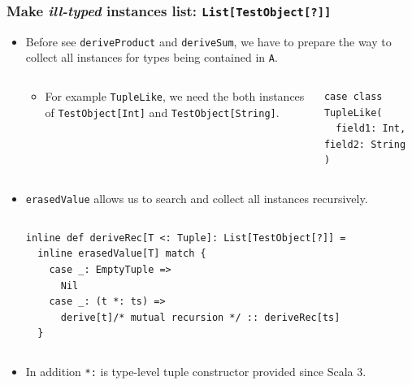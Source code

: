\begin{frame}[fragile]
  \frametitle{ Make \emph{ill-typed} instances list: \lstinline|List[TestObject[?]]|}
  
  \begin{itemize}
    \item Before see \lstinline|deriveProduct| and \lstinline|deriveSum|,
    we have to prepare the way to collect all instances for types being contained in \lstinline|A|.
    \begin{columns}
      \begin{column}{0.55\textwidth}
        \begin{itemize}
          \item For example \lstinline|TupleLike|, 
          we need the both instances of \lstinline|TestObject[Int]| and \lstinline|TestObject[String]|.
        \end{itemize}
      \end{column}
      \begin{column}{0.35\textwidth}
\begin{lstlisting}[style=scala]
case class TupleLike(
  field1: Int, field2: String
)
\end{lstlisting}
      \end{column}
    \end{columns}

    \item \lstinline|erasedValue| allows us to search and collect all instances recursively.
    \begin{columns}
      \begin{column}{0.6\textwidth}
\begin{lstlisting}[style=scala]
inline def deriveRec[T <: Tuple]: List[TestObject[?]] =
  inline erasedValue[T] match {
    case _: EmptyTuple =>
      Nil
    case _: (t *: ts) =>
      derive[t]/* mutual recursion */ :: deriveRec[ts]
  }
\end{lstlisting}
      \end{column}
    \end{columns}

    \item In addition \lstinline|*:| is type-level tuple constructor
    provided since Scala 3.
  \end{itemize}


\end{frame}
